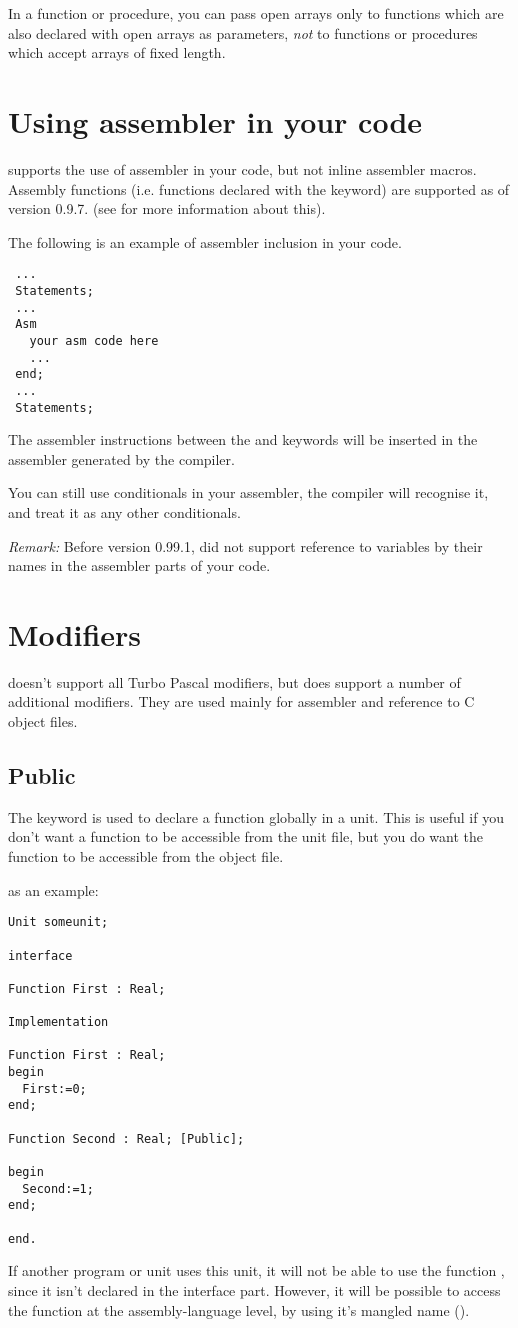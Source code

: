 \documentclass{report}
\begin{document}
In a function or procedure, you can pass open arrays only to functions which 
are also declared with open arrays as parameters, {\em not} to functions or 
procedures which accept arrays of fixed length.

\section{Using assembler in your code}
\fpc supports the use of assembler in your code, but not inline
assembler macros. Assembly functions (i.e. functions declared with the
 keyword) are supported as of version 0.9.7. (see
\progref for more information about this).

The following is an example of assembler inclusion in your code.
\begin{verbatim}
 ...
 Statements;
 ...
 Asm
   your asm code here
   ...
 end;
 ...
 Statements;
\end{verbatim}

The assembler instructions between the  and  keywords will
be inserted in the assembler generated by the compiler.

You can still use conditionals in your assembler, the compiler will
recognise it, and treat it as any other conditionals.

\emph{ Remark: } Before version 0.99.1, \fpc did not support
reference to variables by their names in the assembler parts of your code.

\section{Modifiers}
\fpc doesn't support all Turbo Pascal modifiers, but
does support a number of additional modifiers. They are used mainly for assembler and
reference to C object files. 

\subsection{Public}
The  keyword is used to declare a function globally in a unit.
This is useful if you don't want a function to be accessible from the unit
file, but you do want the function to be accessible from the object file.

as an example:
\begin{CodEx}
\begin{verbatim}
Unit someunit;

interface

Function First : Real;

Implementation

Function First : Real;
begin
  First:=0;
end;

Function Second : Real; [Public];

begin
  Second:=1;
end;

end.
\end{verbatim} 
\end{CodEx}
If another program or unit uses this unit, it will not be able to use the
function , since it isn't declared in the interface part.
However, it will be possible to access the function  at the
assembly-language level, by using it's mangled name (\progref).
\end{document}
